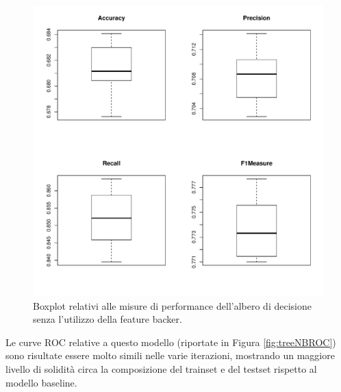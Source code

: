 \begin{figure}
	\centering
	\includegraphics[width=0.7\linewidth]{../FinalResults/TreeNB_performance}
	\caption{Boxplot relativi alle misure di performance dell'albero di decisione senza l'utilizzo della feature backer.}
	\label{fig:treenbperformance}
\end{figure}
Le curve ROC relative a questo modello (riportate in Figura \ref{fig:treeNBROC}) sono risultate essere molto simili nelle varie iterazioni, mostrando un maggiore livello di solidità circa la composizione del trainset e del testset rispetto al modello baseline.
